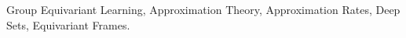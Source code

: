 \documentclass[twoside,11pt]{article}
\begin{document}
\begin{abstract}
\end{abstract}

\begin{keywords}
 Group  Equivariant Learning, Approximation Theory, Approximation Rates, Deep Sets, Equivariant Frames.
\end{keywords}











\tableofcontents
\end{document}
